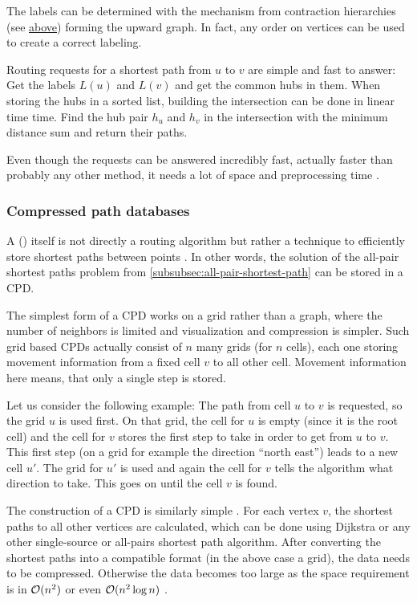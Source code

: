 			The labels can be determined with the mechanism from contraction hierarchies (see \hyperref[subsubsec:ch]{above}) forming the upward graph.
			In fact, any order on vertices can be used to create a correct labeling.

			Routing requests for a shortest path from $u$ to $v$ are simple and fast to answer:
			Get the labels $L(u)$ and $L(v)$ and get the common hubs in them.
			When storing the hubs in a sorted list, building the intersection can be done in linear time time.
			Find the hub pair $h_u$ and $h_v$ in the intersection with the minimum distance sum and return their paths.
			
			Even though the requests can be answered incredibly fast, actually faster than probably any other method, it needs a lot of space and preprocessing time \cite[23]{bast-transportation-networks}.
		
		\subsubsection{Compressed path databases}
		
			A  () itself is not directly a routing algorithm but rather a technique to efficiently store shortest paths between points \cite{botea-cpd-2013}.
			In other words, the solution of the all-pair shortest paths problem from \cref{subsubsec:all-pair-shortest-path} can be stored in a CPD.
			
			The simplest form of a CPD works on a grid rather than a graph, where the number of neighbors is limited and visualization and compression is simpler.
			Such grid based CPDs actually consist of $n$ many grids (for $n$ cells), each one storing movement information from a fixed cell $v$ to all other cell.
			Movement information here means, that only a single step is stored.
			
			Let us consider the following example:
			The path from cell $u$ to $v$ is requested, so the grid $u$ is used first.
			On that grid, the cell for $u$ is empty (since it is the root cell) and the cell for $v$ stores the first step to take in order to get from $u$ to $v$.
			This first step (on a grid for example the direction \enquote{north east}) leads to a new cell $u'$.
			The grid for $u'$ is used and again the cell for $v$ tells the algorithm what direction to take.
			This goes on until the cell $v$ is found.
			
			The construction of a CPD is similarly simple \cite[2]{botea-cpd-2013}.
			For each vertex $v$, the shortest paths to all other vertices are calculated, which can be done using Dijkstra or any other single-source or all-pairs shortest path algorithm.
			After converting the shortest paths into a compatible format (in the above case a grid), the data needs to be compressed.
			Otherwise the data becomes too large as the space requirement is in $\mathcal{O}(n^2)$ or even $\mathcal{O}(n^2 \log n)$ \cite[1]{botea-cpd-2013}.
			
